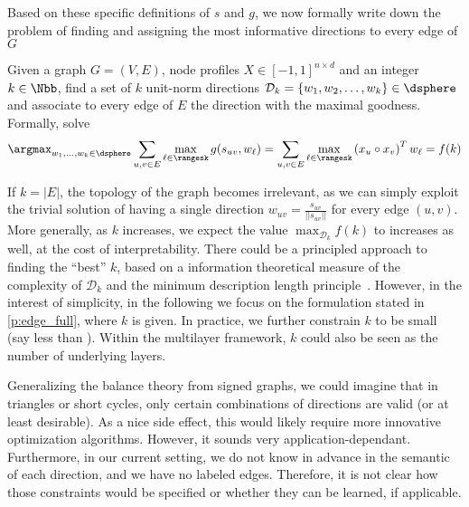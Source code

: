 Based on these specific definitions of $s$ and $g$, we now formally write down the problem of
finding and assigning the most informative directions to every edge of $G$
\begin{problem}[]
  \label{p:edge_full}
  Given a graph $G=(V, E)$, node profiles $X\in [-1, 1]^{n\times d}$ and an integer $k \in \Nbb$,
  find a set of $k$ unit-norm directions $\mathcal{D}_k = \{w_1, w_2, \ldots, w_k\} \in \dsphere$
  and associate to every edge of $E$ the direction with the maximal goodness. Formally, solve
  \begin{equation}
    \label{eq:edge_full}
    \argmax_{w_1,\ldots,w_k \in \dsphere}
    \sum_{u,v \in E} \max_{\ell \in \rangesk} g(s_{uv}, w_{\ell}) =
    \sum_{u,v \in E} \max_{\ell \in \rangesk} \left(x_u \circ x_v\right)^T w_{\ell} = f(k)
  \end{equation}
\end{problem}

If $k=|E|$, the topology of the graph becomes irrelevant, as we can simply exploit the trivial
solution of having a single direction $w_{uv} = \frac{s_{uv}}{||s_{uv}||}$ for every edge $(u,v)$.
More generally, as $k$ increases, we expect the value $\max_{\mathcal{D}_k} f(k)$ to increases as
well, at the cost of interpretability. There could be a principled approach to finding the
\enquote{best} $k$, based on a information theoretical measure of the complexity of $\mathcal{D}_k$
and the minimum description length principle~\autocite{grunwald2005tutorial}. However, in the
interest of simplicity, in the following we focus on the formulation stated in
\autoref{p:edge_full}, where $k$ is given. In practice, we further constrain $k$ to be small (say
less than ). Within the multilayer framework, $k$ could also be seen as the number of
underlying layers.

\begin{aside}
Generalizing the balance theory from signed graphs, we could imagine that in triangles or short
cycles, only certain combinations of directions are valid (or at least desirable). As a nice side
effect, this would likely require more innovative optimization algorithms. However, it sounds very
application-dependant. Furthermore, in our current setting, we do not know in advance in the
semantic of each direction, and we have no labeled edges. Therefore, it is not clear how those
constraints would be specified or whether they can be learned, if applicable. 
\end{aside}

